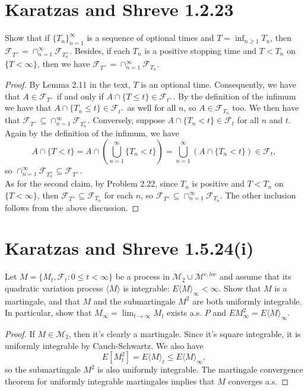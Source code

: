 \documentclass[11pt,letterpaper]{report}
\newcommand{\mcal}[1]{\mathcal{#1}}
\theoremstyle{definition}
\begin{document}
\section*{Karatzas and Shreve 1.2.23}
Show that if $\{T_n\}_{n=1}^\infty$ is a sequence of optional times and $T = \inf_{n\geq 1}T_n$, then $\mcal{F}_{T^+} = \cap_{n=1}^\infty \mcal{F}_{T_n^+}$. Besides, if each $T_n$ is a positive stopping time and $T<T_n$ on $\{T<\infty\}$, then we have $\mcal{F}_{T^+} = \cap_{n=1}^\infty \mcal{F}_{T_n}$.
\begin{proof}
	By Lemma 2.11 in the text, $T$ is an optional time. Consequently, we have that $A\in \mcal{F}_{T^+}$ if and only if $A\cap \{T\leq t\}\in \mcal{F}_{t^+}$. By the definition of the infimum we have that $A\cap \{T_n\leq t\}\in \mcal{F}_{t^+}$ as well for all $n$, so $A\in \mcal{F}_{T_n}$ too. We then have that $\mcal{F}_{T^+}\subseteq \cap_{n=1}^\infty \mcal{F}_{T_n^+}$. Conversely, suppose $A\cap \{T_n<t\}\in \mcal{F}_t$ for all $n$ and $t$. Again by the definition of the infimum, we have
	\[
	A\cap \{T<t\} = A\cap \left(\bigcup_{n=1}^\infty\{T_n<t\}\right) = \bigcup_{n=1}^\infty(A\cap \{T_n<t\})\in \mcal{F}_t,
	\]
	so $\cap_{n=1}^\infty \mcal{F}_{T_n^+}\subseteq \mcal{F}_{T^+}$.\\

	\noindent As for the second claim, by Problem 2.22, since $T_n$ is positive and $T<T_n$ on $\{T<\infty\}$, then $\mcal{F}_{T^+} \subseteq \mcal{F}_{T_n}$ for each $n$, so $\mcal{F}_{T^+}\subseteq \cap_{n=1}^\infty \mcal{F}_{T_n}$. The other inclusion follows from the above discussion.
\end{proof}










\section*{Karatzas and Shreve 1.5.24(i)}
Let $M = \{M_t, \mcal{F}_t: 0\leq t<\infty\}$ be a process in $\mcal{M}_2\cup \mcal{M}^{c, loc}$ and assume that its quadratic variation process $\langle M\rangle$ is integrable: $E\langle M\rangle_\infty<\infty$. Show that $M$ is a martingale, and that $M$ and the submartingale $M^2$ are both uniformly integrable. In particular, show that $M_\infty = \lim_{t\to \infty}M_t$ exists a.s. $P$ and $EM_\infty^2 = E\langle M\rangle_\infty$.
\begin{proof}
	If $M\in \mcal{M}_2$, then it's clearly a martingale. Since it's square integrable, it is uniformly integrable by Cauch-Schwartz. We also have
	\[
	E[M_t^2] = E\langle M\rangle_t \leq E\langle M\rangle_\infty,
	\]
	so the submartingale $M^2$ is also uniformly integrable. The martingale convergence theorem for uniformly integrable martingales implies that $M$ converges a.s.
\end{proof}
\end{document}
